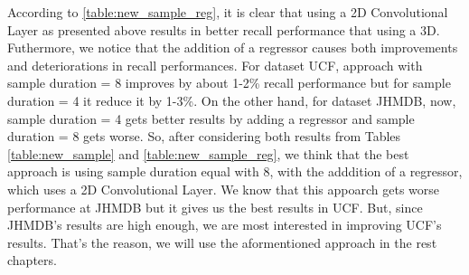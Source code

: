 According to \ref{table:new_sample_reg}, it is clear that using a 2D Convolutional Layer as presented above results in better recall performance that using a 3D. Futhermore, we notice that
the addition of a regressor causes both improvements and deteriorations in recall performances. For dataset UCF, approach with sample duration = 8 improves by about 1-2\% recall performance
but for sample duration = 4 it reduce it by 1-3\%. On the other hand, for dataset JHMDB, now, sample duration = 4 gets better results by adding a regressor and sample duration = 8 gets
worse. So, after considering both results from Tables \ref{table:new_sample} and \ref{table:new_sample_reg}, we think that the best approach is using sample duration equal with 8, with the
adddition of a regressor, which uses a 2D Convolutional Layer. We know that this appoarch gets worse performance at JHMDB but it gives us the best results in UCF. But, since JHMDB's results are
high enough, we are most interested in improving UCF's results. That's the reason, we will use the aformentioned approach in the rest chapters.

% 

